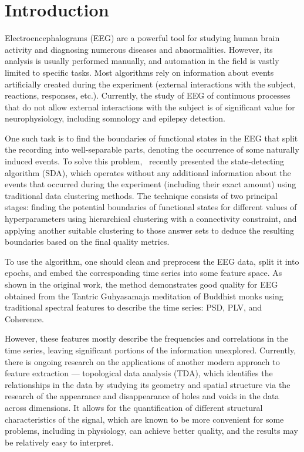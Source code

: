 \documentclass[pdflatex,sn-basic,Numbered]{sn-jnl}
\begin{document}
\section{Introduction}

Electroencephalograms (EEG) are a powerful tool for studying human brain activity and diagnosing numerous diseases and abnormalities. However, its analysis is usually performed manually, and automation in the field is vastly limited to specific tasks. Most algorithms rely on information about events artificially created during the experiment (external interactions with the subject, reactions, responses, etc.). Currently, the study of EEG of continuous processes that do not allow external interactions with the subject is of significant value for neurophysiology, including somnology and epilepsy detection.

One such task is to find the boundaries of functional states in the EEG that split the recording into well-separable parts, denoting the occurrence of some naturally induced events. To solve this problem,~\cite{SDA} recently presented the state-detecting algorithm (SDA), which operates without any additional information about the events that occurred during the experiment (including their exact amount) using traditional data clustering methods. The technique consists of two principal stages: finding the potential boundaries of functional states for different values of hyperparameters using hierarchical clustering with a connectivity constraint, and applying another suitable clustering to those answer sets to deduce the resulting boundaries based on the final quality metrics.

To use the algorithm, one should clean and preprocess the EEG data, split it into epochs, and embed the corresponding time series into some feature space. As shown in the original work, the method demonstrates good quality for EEG obtained from the Tantric Guhyasamaja meditation of Buddhist monks using traditional spectral features to describe the time series: PSD, PLV, and Coherence.

However, these features mostly describe the frequencies and correlations in the time series, leaving significant portions of the information unexplored. Currently, there is ongoing research on the applications of another modern approach to feature extraction --- topological data analysis (TDA), which identifies the relationships in the data by studying its geometry and spatial structure via the research of the appearance and disappearance of holes and voids in the data across dimensions. It allows for the quantification of different structural characteristics of the signal, which are known to be more convenient for some problems, including in physiology, can achieve better quality, and the results may be relatively easy to interpret.
\end{document}
